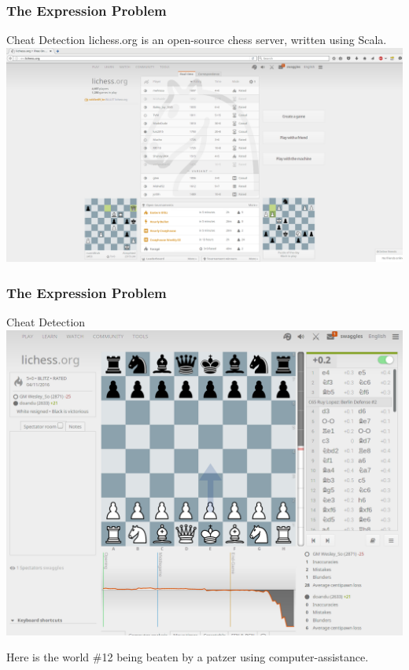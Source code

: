 \begin{frame}[fragile]
\frametitle{The Expression Problem}
\begin{block}{Cheat Detection}
lichess.org is an open-source chess server, written using Scala.
\includegraphics[height=0.4\textheight,natwidth=1867,natheight=1011]{image/lichess.png}
\end{block}
\end{frame}

\begin{frame}[fragile]
\frametitle{The Expression Problem}
\begin{block}{Cheat Detection}
\includegraphics[height=0.5\textheight,natwidth=1140,natheight=878]{image/lichess-wesley-so.png}
\par
Here is the world \#12 being beaten by a patzer using computer-assistance.
\end{block}
\end{frame}

